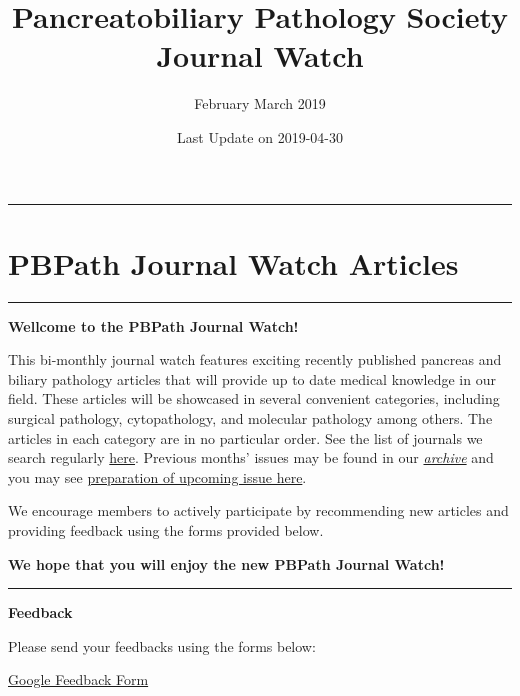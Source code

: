 \documentclass[]{article}
\title{Pancreatobiliary Pathology Society Journal Watch}
\subtitle{February March 2019}
\author{}
\date{Last Update on 2019-04-30}
\begin{document}
\maketitle

{
\setcounter{tocdepth}{5}
\tableofcontents
}
\begin{center}\rule{0.5\linewidth}{\linethickness}\end{center}

\hypertarget{pbpath-journal-watch-articles}{%
\section{PBPath Journal Watch
Articles}\label{pbpath-journal-watch-articles}}

\begin{center}\rule{0.5\linewidth}{\linethickness}\end{center}

\textbf{Wellcome to the PBPath Journal Watch!}

This bi-monthly journal watch features exciting recently published
pancreas and biliary pathology articles that will provide up to date
medical knowledge in our field. These articles will be showcased in
several convenient categories, including surgical pathology,
cytopathology, and molecular pathology among others. The articles in
each category are in no particular order. See the list of journals we
search regularly \href{http://pbpath.org/pbpath-journal-watch/}{here}.
Previous months' issues may be found in our
\emph{\href{http://pbpath.org/journal-watch-archive/}{archive}} and you
may see
\href{http://pbpath.org/journal-watch-upcoming-issue/}{preparation of
upcoming issue here}.

We encourage members to actively participate by recommending new
articles and providing feedback using the forms provided below.

\textbf{We hope that you will enjoy the new PBPath Journal Watch!}

\begin{center}\rule{0.5\linewidth}{\linethickness}\end{center}

\textbf{Feedback}

Please send your feedbacks using the forms below:

\href{https://docs.google.com/forms/d/e/1FAIpQLSeD3Z9J6Y7eMmiyM12f_SfAmHUlykb1zxZcwO6lg7cebGYQIQ/viewform}{Google
Feedback Form}

\hypertarget{disqus_thread}{}
\end{document}
